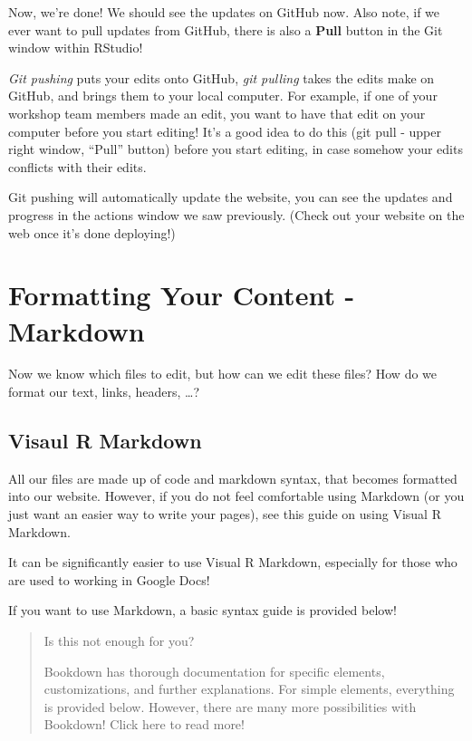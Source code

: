 \documentclass[
]{book}
\theoremstyle{definition}
\theoremstyle{definition}
\theoremstyle{definition}
\theoremstyle{definition}
\theoremstyle{remark}
\begin{document}
Now, we're done! We should see the updates on GitHub now. Also note, if we ever want to pull updates from GitHub, there is also a \textbf{Pull} button in the Git window within RStudio!

\emph{Git pushing} puts your edits onto GitHub, \emph{git pulling} takes the edits make on GitHub, and brings them to your local computer. For example, if one of your workshop team members made an edit, you want to have that edit on your computer before you start editing! It's a good idea to do this (git pull - upper right window, ``Pull'' button) before you start editing, in case somehow your edits conflicts with their edits.

Git pushing will automatically update the website, you can see the updates and progress in the actions window we saw previously. (Check out your website on the web once it's done deploying!)

\chapter{Formatting Your Content - Markdown}\label{formatting-your-content---markdown}

Now we know which files to edit, but how can we edit these files? How do we format our text, links, headers, \ldots?

\section{Visaul R Markdown}\label{visual-r-md}

All our files are made up of code and markdown syntax, that becomes formatted into our website. However, if you do not feel comfortable using Markdown (or you just want an easier way to write your pages), see this guide on using Visual R Markdown.

It can be significantly easier to use Visual R Markdown, especially for those who are used to working in Google Docs!

If you want to use Markdown, a basic syntax guide is provided below!

\begin{quote}
Is this not enough for you?

Bookdown has thorough documentation for specific elements, customizations, and further explanations. For simple elements, everything is provided below. However, there are many more possibilities with Bookdown! Click here to read more!
\end{quote}
\end{document}
